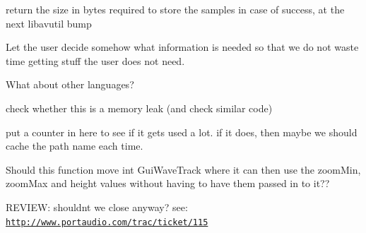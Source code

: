 \begin{DoxyRefList}
\item[\label{todo__todo000001}%
\hypertarget{todo__todo000001}{}%
Member \hyperlink{group__lavc__misc_ga66b44aad56fa22a78fb8916eb8cc0516}{avcodec\+\_\+fill\+\_\+audio\+\_\+frame} (\hyperlink{struct_a_v_frame}{A\+V\+Frame} $\ast$frame, int nb\+\_\+channels, enum A\+V\+Sample\+Format sample\+\_\+fmt, const uint8\+\_\+t $\ast$buf, int buf\+\_\+size, int align)]return the size in bytes required to store the samples in case of success, at the next libavutil bump  
\item[\label{todo__todo000002}%
\hypertarget{todo__todo000002}{}%
Member \hyperlink{group__lavf__decoding_gad42172e27cddafb81096939783b157bb}{avformat\+\_\+find\+\_\+stream\+\_\+info} (\hyperlink{struct_a_v_format_context}{A\+V\+Format\+Context} $\ast$ic, A\+V\+Dictionary $\ast$$\ast$options)]Let the user decide somehow what information is needed so that we do not waste time getting stuff the user does not need.  
\item[\label{todo__todo000003}%
\hypertarget{todo__todo000003}{}%
Member \hyperlink{struct_a_v_option_a6c72d22b8c599e89abba088b85dfcd8a}{A\+V\+Option\+:\+:help} ]What about other languages?  
\item[\label{todo__todo000062}%
\hypertarget{todo__todo000062}{}%
Member \hyperlink{class_expanding_tool_bar_ad1dc9d80b11f61df0f9761c55d5aa33d}{Expanding\+Tool\+Bar\+:\+:Expanding\+Tool\+Bar} (wx\+Window $\ast$parent, wx\+Window\+ID id, const wx\+Point \&pos=wx\+Default\+Position, const wx\+Size \&size=wx\+Default\+Size)]check whether this is a memory leak (and check similar code)  
\item[\label{todo__todo000046}%
\hypertarget{todo__todo000046}{}%
Member \hyperlink{class_file_names_a703e46fe9ac21e11b497d08f3856400c}{File\+Names\+:\+:Temp\+Dir} ()]put a counter in here to see if it gets used a lot. if it does, then maybe we should cache the path name each time.  
\item[\label{todo__todo000051}%
\hypertarget{todo__todo000051}{}%
Member \hyperlink{_track_artist_8h_a00fc87b63f1436536d3090852d57f810}{Get\+Wave\+Y\+Pos} (float value, float min, float max, int height, bool dB, bool outer, float d\+Br, bool clip)]Should this function move int Gui\+Wave\+Track where it can then use the zoom\+Min, zoom\+Max and height values without having to have them passed in to it??  
\item[\label{todo__todo000015}%
\hypertarget{todo__todo000015}{}%
Member \hyperlink{pa__front_8c_a92f56f88cbd14da0e8e03077e835d104}{Pa\+\_\+\+Close\+Stream} (Pa\+Stream $\ast$stream)]R\+E\+V\+I\+EW\+: shouldn\textquotesingle{}t we close anyway? see\+: \href{http://www.portaudio.com/trac/ticket/115}{\tt http\+://www.\+portaudio.\+com/trac/ticket/115}  
$$
\end{DoxyRefList}
